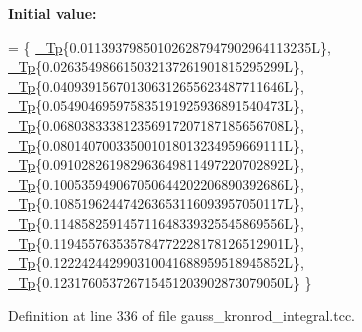 {\bfseries Initial value\+:}
\begin{DoxyCode}
=
      \{
        \hyperlink{namespace____gnu__cxx_a3b19a9c800ca194374ef9172290f7d79}{\_Tp}\{0.011393798501026287947902964113235L\},
        \hyperlink{namespace____gnu__cxx_a3b19a9c800ca194374ef9172290f7d79}{\_Tp}\{0.026354986615032137261901815295299L\},
        \hyperlink{namespace____gnu__cxx_a3b19a9c800ca194374ef9172290f7d79}{\_Tp}\{0.040939156701306312655623487711646L\},
        \hyperlink{namespace____gnu__cxx_a3b19a9c800ca194374ef9172290f7d79}{\_Tp}\{0.054904695975835191925936891540473L\},
        \hyperlink{namespace____gnu__cxx_a3b19a9c800ca194374ef9172290f7d79}{\_Tp}\{0.068038333812356917207187185656708L\},
        \hyperlink{namespace____gnu__cxx_a3b19a9c800ca194374ef9172290f7d79}{\_Tp}\{0.080140700335001018013234959669111L\},
        \hyperlink{namespace____gnu__cxx_a3b19a9c800ca194374ef9172290f7d79}{\_Tp}\{0.091028261982963649811497220702892L\},
        \hyperlink{namespace____gnu__cxx_a3b19a9c800ca194374ef9172290f7d79}{\_Tp}\{0.100535949067050644202206890392686L\},
        \hyperlink{namespace____gnu__cxx_a3b19a9c800ca194374ef9172290f7d79}{\_Tp}\{0.108519624474263653116093957050117L\},
        \hyperlink{namespace____gnu__cxx_a3b19a9c800ca194374ef9172290f7d79}{\_Tp}\{0.114858259145711648339325545869556L\},
        \hyperlink{namespace____gnu__cxx_a3b19a9c800ca194374ef9172290f7d79}{\_Tp}\{0.119455763535784772228178126512901L\},
        \hyperlink{namespace____gnu__cxx_a3b19a9c800ca194374ef9172290f7d79}{\_Tp}\{0.122242442990310041688959518945852L\},
        \hyperlink{namespace____gnu__cxx_a3b19a9c800ca194374ef9172290f7d79}{\_Tp}\{0.123176053726715451203902873079050L\}
      \}
\end{DoxyCode}


Definition at line 336 of file gauss\+\_\+kronrod\+\_\+integral.\+tcc.

\mbox{\label{struct____gnu__cxx_1_1qk__integrator_3_01__Tp_00_01__FuncTp_00_01Kronrod__51_01_4_a8d7e36c2d8170d042fa9304f7a8fe19e}} 
